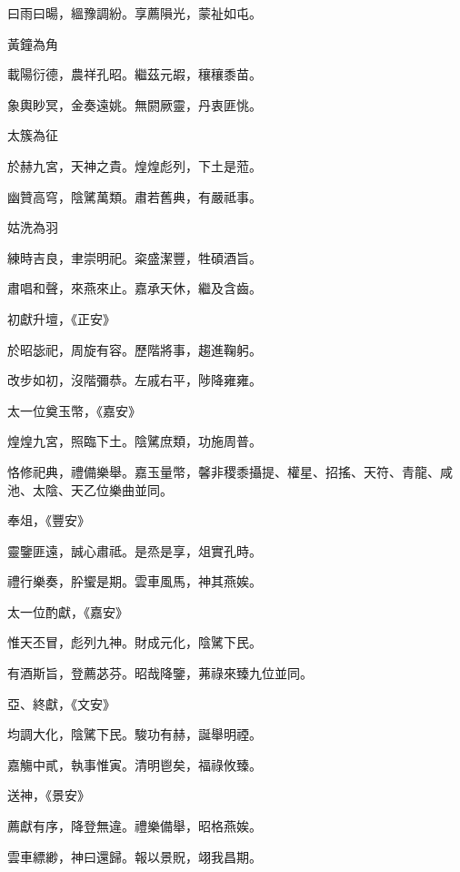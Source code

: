 \begin{pinyinscope}
 曰雨曰暘，縕豫調紛。享薦隕光，蒙祉如屯。



 黃鐘為角



 載陽衍德，農祥孔昭。繼茲元嘏，穰穰黍苗。



 象輿眇冥，金奏遠姚。無閼厥靈，丹衷匪恌。



 太簇為征



 於赫九宮，天神之貴。煌煌彪列，下土是蒞。



 幽贊高穹，陰騭萬類。肅若舊典，有嚴祗事。



 姑洗為羽



 練時吉良，聿崇明祀。粢盛潔豐，牲碩酒旨。



 肅唱和聲，來燕來止。嘉承天休，繼及含齒。



 初獻升壇，《正安》



 於昭毖祀，周旋有容。歷階將事，趨進鞠躬。



 改步如初，沒階彌恭。左戚右平，陟降雍雍。



 太一位奠玉幣，《嘉安》



 煌煌九宮，照臨下土。陰騭庶類，功施周普。



 恪修祀典，禮備樂舉。嘉玉量幣，馨非稷黍攝提、權星、招搖、天符、青龍、咸池、太陰、天乙位樂曲並同。



 奉俎，《豐安》



 靈鑒匪遠，誠心肅祗。是烝是享，俎實孔時。



 禮行樂奏，肸蠁是期。雲車風馬，神其燕娭。



 太一位酌獻，《嘉安》



 惟天丕冒，彪列九神。財成元化，陰騭下民。



 有酒斯旨，登薦苾芬。昭哉降鑒，茀祿來臻九位並同。



 亞、終獻，《文安》



 均調大化，陰騭下民。駿功有赫，誕舉明禋。



 嘉觴中貳，執事惟寅。清明鬯矣，福祿攸臻。



 送神，《景安》



 薦獻有序，降登無違。禮樂備舉，昭格燕娭。



 雲車縹緲，神曰還歸。報以景貺，翊我昌期。



\end{pinyinscope}